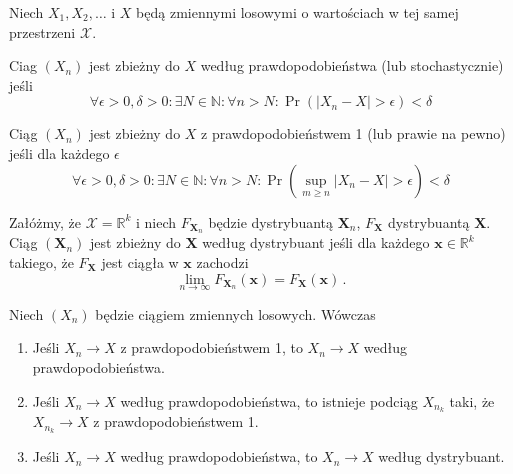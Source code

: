 \documentclass{myclass}
\numberwithin{equation}{subsection}
\begin{document}
Niech \(X_1, X_2, \ldots\) i \(X\) będą zmiennymi losowymi o wartościach w tej samej przestrzeni
\(\mathcal{X}\).

\begin{definition}
Ciag \((X_n)\) jest zbieżny do \(X\) według prawdopodobieństwa (lub stochastycznie) jeśli
\begin{equation*}
    \forall \epsilon > 0, \delta > 0 : \exists N \in \mathbb{N} : \forall n > N : \Pr\left(|X_n - X| > \epsilon\right) < \delta
\end{equation*}
\end{definition}

\begin{definition}
Ciąg \((X_n)\) jest zbieżny do \(X\) z prawdopodobieństwem 1 (lub prawie na pewno) jeśli dla każdego
\(\epsilon\)
\begin{equation*}
    \forall \epsilon > 0, \delta > 0 : \exists N \in \mathbb{N} : \forall n > N : \Pr\left(\sup_{m \geq n} |X_n - X| >  \epsilon\right) < \delta
\end{equation*}
\end{definition}

\begin{definition}
Załóżmy, że \(\mathcal{X} = \mathbb{R}^k\) i niech \(F_{\bm{X}_n}\) będzie dystrybuantą
\(\bm{X}_n\), \(F_{\bm{X}}\) dystrybuantą \(\bm{X}\). Ciąg \((\bm{X}_n)\) jest zbieżny do \(\bm{X}\)
według dystrybuant jeśli dla każdego \(\bm{x} \in \mathbb{R}^k\) takiego, że \(F_{\bm{X}}\) jest
ciągła w \(\bm{x}\) zachodzi
\begin{equation*}
    \lim_{n \to \infty} F_{\bm{X}_n}(\bm{x}) = F_{\bm{X}}(\bm{x})\,.
\end{equation*}
\end{definition}

\begin{theorem}
Niech \((X_n)\) będzie ciągiem zmiennych losowych. Wówczas
\begin{enumerate}

    \item Jeśli \(X_n \to X\) z prawdopodobieństwem 1, to \(X_n \to X\) według prawdopodobieństwa.

    \item Jeśli \(X_n \to X\) według prawdopodobieństwa, to istnieje podciąg \(X_{n_k}\) taki, że
    \(X_{n_k} \to X\) z prawdopodobieństwem 1.

    \item Jeśli \(X_n \to X\) według prawdopodobieństwa, to \(X_n \to X\) według dystrybuant.

\end{enumerate}
\end{theorem}
\end{document}
